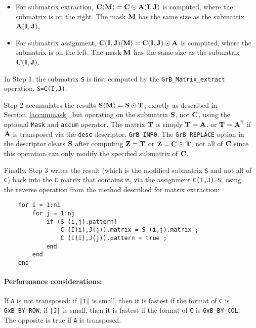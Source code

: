 \documentclass[12pt]{article}
\begin{document}
\begin{itemize}

\item
For submatrix extraction,
${\bf C \langle M \rangle = C \odot A(I,J)}$ is computed,
where the submatrix is on the right.
The mask ${\bf M}$ has the same size as the submatrix ${\bf A(I,J)}$.

\item
For submatrix assignment,
${\bf C(I,J) \langle M \rangle = C(I,J) \odot A}$ is computed,
where the submatrix is on the left.
The mask ${\bf M}$ has the same size as the submatrix ${\bf C(I,J)}$.

\end{itemize}

In Step 1, the submatrix \verb'S' is first computed by the
\verb'GrB_Matrix_extract' operation, \verb'S=C(I,J)'.

Step 2 accumulates the results ${\bf S \langle M \rangle  = S \odot T}$,
exactly as described in Section~\ref{accummask}, but operating on the submatrix
${\bf S}$, not ${\bf C}$, using the optional \verb'Mask' and \verb'accum'
operator.  The matrix ${\bf T}$ is simply ${\bf T}={\bf A}$, or ${\bf T}={\bf
A}^{\sf T}$ if ${\bf A}$ is transposed via the \verb'desc' descriptor,
\verb'GrB_INP0'.  The \verb'GrB_REPLACE' option in the descriptor clears ${\bf
S}$ after computing ${\bf Z = T}$ or ${\bf Z = C \odot T}$, not all of ${\bf
C}$ since this operation can only modify the specified submatrix of ${\bf C}$.

Finally, Step 3 writes the result (which is the modified submatrix \verb'S' and
not all of \verb'C') back into the \verb'C' matrix that contains it, via the
assignment \verb'C(I,J)=S', using the reverse operation from the method
described for matrix extraction:

    {\footnotesize
    \begin{verbatim}
    for i = 1:ni
        for j = 1:nj
            if (S (i,j).pattern)
                C (I(i),J(j)).matrix = S (i,j).matrix ;
                C (I(i),J(j)).pattern = true ;
            end
        end
    end \end{verbatim}}

\paragraph{\bf Performance considerations:} %
If \verb'A' is not transposed: if \verb'|I|' is small, then it is fastest if
the format of \verb'C' is \verb'GxB_BY_ROW'; if \verb'|J|' is small, then it is
fastest if the format of \verb'C' is \verb'GxB_BY_COL'.  The opposite is true
if \verb'A' is transposed.
\end{document}
